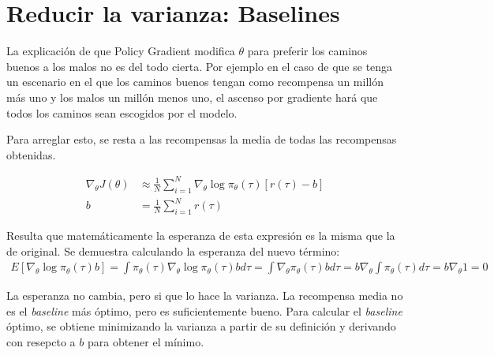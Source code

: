 \section{Reducir la varianza: Baselines}%
\label{sec:reducir_la_varianza_baselines}

La explicación de que Policy Gradient modifica $\theta$ para preferir los caminos buenos a los
malos no es del todo cierta. Por ejemplo en el caso de que se tenga un escenario en el que
los caminos buenos tengan como recompensa un millón más uno y los malos un millón menos uno, el
ascenso por gradiente hará que todos los caminos sean escogidos por el modelo.

Para arreglar esto, se resta a las recompensas la media de todas las recompensas
obtenidas.

\begin{align}
    \nabla _ { \theta } J ( \theta ) &\approx \frac { 1 } { N } \sum _ { i = 1 } ^ { N } \nabla _ {
\theta } \operatorname { log } \pi _ { \theta } ( \tau ) [ r ( \tau ) - b ]\\
        b &= \frac{1}{N} \sum_{i=1}^{N}r(\tau)
\end{align}

Resulta que matemáticamente la esperanza de esta expresión es la misma que la de original. Se
demuestra calculando la esperanza del nuevo término:
\begin{align}
E [ \nabla _ { \theta } \operatorname { log } \pi _ { \theta } ( \tau ) b ] = \int \pi _ { \theta } ( \tau ) \nabla _ { \theta } \operatorname { log } \pi _ { \theta } ( \tau ) b d \tau = \int \nabla _ { \theta } \pi _ { \theta } ( \tau ) b d \tau = b \nabla _ { \theta } \int \pi _ { \theta } ( \tau ) d \tau = b \nabla _ { \theta } 1 = 0
\end{align}

La esperanza no cambia, pero si que lo hace la varianza. La recompensa media no es el
\textit{baseline} más óptimo, pero es suficientemente bueno. Para calcular el \textit{baseline}
óptimo, se obtiene minimizando la varianza a partir de su definición y derivando con
resepcto a $b$ para obtener el mínimo.

